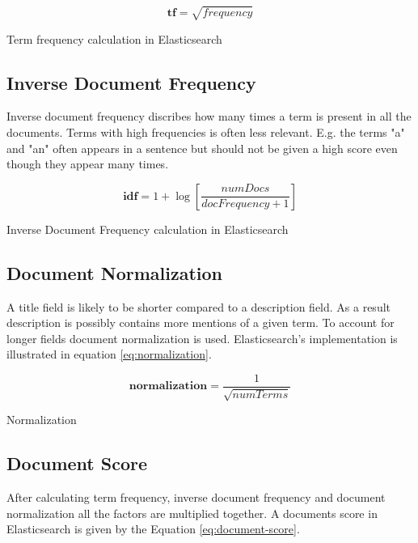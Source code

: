 \begin{cequation}[H]
	\begin{equation}
		\mathbf{tf} = \sqrt{frequency}
	\end{equation}
	\caption{Term frequency calculation in Elasticsearch}
  \label{eq:term-frequency}
\end{cequation}

\subsection{Inverse Document Frequency}
Inverse document frequency discribes how many times a term is present in all the documents.
Terms with high frequencies is often less relevant.
E.g. the terms "a" and "an" often appears in a sentence but should not be given a high score even though they appear many times.

\begin{cequation}[H]
	\begin{equation}
		\mathbf{idf} = 1 + \log{[\frac{numDocs}{docFrequency + 1}]}
	\end{equation}
	\caption{Inverse Document Frequency calculation in Elasticsearch}
  \label{eq:idf}
\end{cequation}

\subsection{Document Normalization}
A title field is likely to be shorter compared to a description field.
As a result description is possibly contains more mentions of a given term.
To account for longer fields document normalization is used.
Elasticsearch's implementation is illustrated in equation \ref{eq:normalization}.

\begin{cequation}[H]
	\begin{equation}
		\mathbf{normalization} = \frac{1}{\sqrt{numTerms}}
	\end{equation}
	\caption{Normalization}
  \label{eq:normalization}
\end{cequation}

\subsection{Document Score}
\label{sec:doc-score}
After calculating term frequency, inverse document frequency and document normalization all the factors are multiplied together.
A documents score in Elasticsearch is given by the Equation \ref{eq:document-score}.

